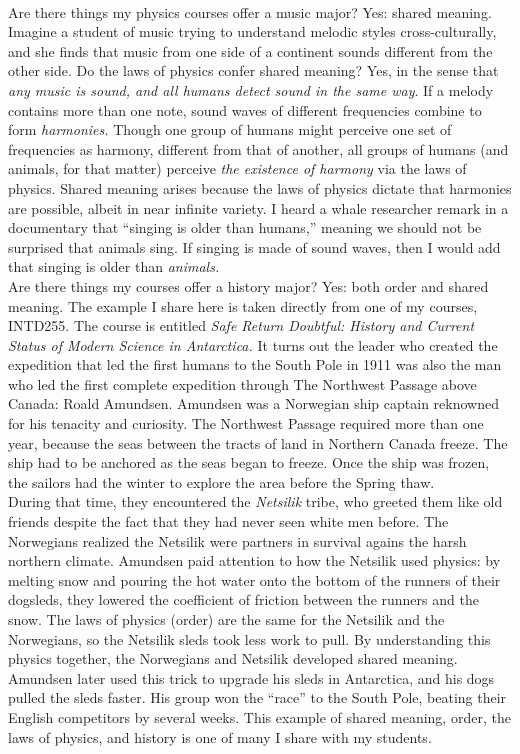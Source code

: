 \documentclass[../../../main.tex]{subfiles}
\begin{document}
\\
\vspace{0.25cm}
Are there things my physics courses offer a music major?  Yes: shared meaning.  Imagine a student of music trying to understand melodic styles cross-culturally, and she finds that music from one side of a continent sounds different from the other side.  Do the laws of physics confer shared meaning?  Yes, in the sense that \textit{any music is sound, and all humans detect sound in the same way}.  If a melody contains more than one note, sound waves of different frequencies combine to form \textit{harmonies.}  Though one group of humans might perceive one set of frequencies as harmony, different from that of another, all groups of humans (and animals, for that matter) perceive \textit{the existence of harmony} via the laws of physics.  Shared meaning arises because the laws of physics dictate that harmonies are possible, albeit in near infinite variety.  I heard a whale researcher remark in a documentary that ``singing is older than humans,'' meaning we should not be surprised that animals sing.  If singing is made of sound waves, then I would add that singing is older than \textit{animals.}
\\
\vspace{0.25cm}
Are there things my courses offer a history major?  Yes: both order and shared meaning.  The example I share here is taken directly from one of my courses, INTD255.  The course is entitled \textit{Safe Return Doubtful: History and Current Status of Modern Science in Antarctica.}  It turns out the leader who created the expedition that led the first humans to the South Pole in 1911 was also the man who led the first complete expedition through The Northwest Passage above Canada: Roald Amundsen.  Amundsen was a Norwegian ship captain reknowned for his tenacity and curiosity.  The Northwest Passage required more than one year, because the seas between the tracts of land in Northern Canada freeze.  The ship had to be anchored as the seas began to freeze.  Once the ship was frozen, the sailors had the winter to explore the area before the Spring thaw.
\\
\vspace{0.25cm}
During that time, they encountered the \textit{Netsilik} tribe, who greeted them like old friends despite the fact that they had never seen white men before.  The Norwegians realized the Netsilik were partners in survival agains the harsh northern climate. Amundsen paid attention to how the Netsilik used physics: by melting snow and pouring the hot water onto the bottom of the runners of their dogsleds, they lowered the coefficient of friction between the runners and the snow.  The laws of physics (order) are the same for the Netsilik and the Norwegians, so the Netsilik sleds took less work to pull.  By understanding this physics together, the Norwegians and Netsilik developed shared meaning.  Amundsen later used this trick to upgrade his sleds in Antarctica, and his dogs pulled the sleds faster.  His group won the ``race'' to the South Pole, beating their English competitors by several weeks.  This example of shared meaning, order, the laws of physics, and history is one of many I share with my students.
\end{document}
